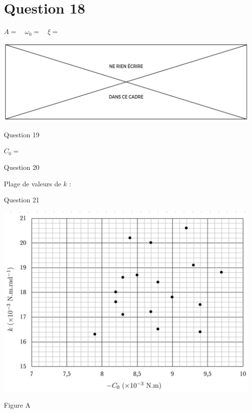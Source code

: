 \documentclass[10pt]{article}
\begin{document}
\section*{Question 18}
$A=\quad \omega_{0}=\quad \xi=$

\begin{center}
\includegraphics[max width=\textwidth]{2024_04_26_3285cfc264024262add0g-29}
\end{center}

Question 19

$C_{0}=$

Question 20

Plage de valeurs de $k$ :

Question 21

\begin{center}
\includegraphics[max width=\textwidth]{2024_04_26_3285cfc264024262add0g-30}
\end{center}

Figure A
\end{document}

